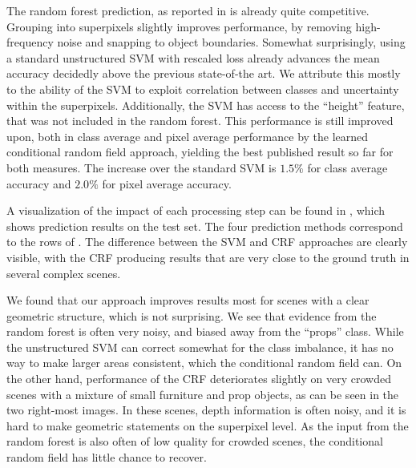 \documentclass[a4paper, 10pt, conference]{ieeeconf}      %
\begin{document}
The random forest prediction, as reported in \citet{stueckler2013} is already quite competitive.
Grouping into superpixels slightly improves performance, by removing
high-frequency noise and snapping to object boundaries. Somewhat surprisingly,
using a standard unstructured SVM with rescaled loss already advances the mean
accuracy decidedly above the previous state-of-the art. We
attribute this mostly to the ability of the SVM to exploit correlation between
classes and uncertainty within the superpixels.
Additionally, the SVM has access to the ``height'' feature, that was not
included in the random forest.
This performance is still improved upon, both in class average and pixel
average performance by the learned conditional random field approach, yielding
the best published result so far for both measures. The increase over the
standard SVM is $1.5\%$ for class average accuracy and $2.0\%$ for pixel
average accuracy.

A visualization of the impact of each processing step can be found in
, which shows prediction results on the test set.  The four
prediction methods correspond to the rows of .  The difference
between the SVM and CRF approaches are clearly visible, with the CRF producing
results that are very close to the ground truth in several complex scenes.

We found that our approach improves results most for scenes with a clear geometric structure,
which is not surprising. We see that evidence from the random forest is often very noisy, and biased
away from the ``props'' class. While the unstructured SVM can correct somewhat
for the class imbalance, it has no way to make larger areas consistent, which
the conditional random field can.
On the other hand, performance of the CRF deteriorates slightly on very crowded
scenes with a mixture of small furniture and prop objects, as
can be seen in the two right-most images. In these scenes, depth information is
often noisy, and it is hard to make geometric statements on the superpixel
level. As the input from the random forest is also often of low quality for
crowded scenes, the conditional random field has little chance to recover.
\end{document}
